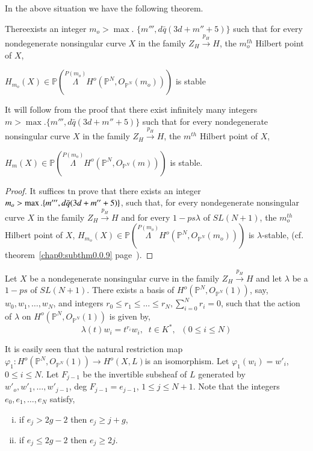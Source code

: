 In the above situation we have the following theorem.

\setcounter{section}{1}
\setcounter{subsection}{0}
\setcounter{subtheorem}{-1}
\begin{subtheorem}\label{chap1:subthm1.0.0}%
There\pageoriginale exists an integer $m_o > \max$. $\{m''', d \bar{q}
(3d+m''+5)\}$ 
such that for every nondegenerate nonsingular curve $X$ in the family
$Z_H \xrightarrow{p_H} H$, the $m_o^{th}$ Hilbert point of $X$, 

\noindent
$H_{m_o} (X) \in \mathbb{P} (\overset{P(m_o)} \Lambda  H^o
(\mathbb{P}^N, O_{\mathbb{P}^N} (m_o)))$  is stable 
\end{subtheorem}

\begin{remark*}
It will follow from the proof that there exist infinitely many integers
$m > \max. \{m''', d \bar{q} (3d+m''+5)\}$ such that for every
nondegenerate nonsingular curve $X$ in the family $Z_H
\xrightarrow{p_H} H$, the $m^{th}$ Hilbert point of $X$,  

\noindent
$H_m (X) \in  \mathbb{P} (\overset{P(m_o)} \Lambda  H^o
(\mathbb{P}^N, O_{\mathbb{P}^N} (m)))$  is stable. 
\end{remark*}

\begin{proof}
It suffices tn prove that there exists an integer $m_o > \max. 
\{m''',\break d \bar{q} (3d+m''+5)\}$, such that, for every nondegenerate
nonsingular curve $X$ in the family $Z_H \xrightarrow{p_H} H$ and
for every  $1-ps \lambda$ of $SL(N+1)$, the $m_o^{th}$ Hilbert point
of $X$, $H_{m_o} (X) \in \mathbb{P} (\overset{P(m_o)}\Lambda  H^o
(\mathbb{P}^N, O{_{\mathbb{P}^N}} (m_o)))$  is $\lambda$-stable,
(cf. theorem~\ref{chap0:subthm0.0.9} page~\pageref{chap0:subthm0.0.9}). 
\end{proof}

Let $X$ be a nondegenerate nonsingular curve in the family $Z_H
\xrightarrow{p_H} H$ and let $\lambda$ be a $1-ps$ of $SL(N+1)$. There
exists a basis of  $H^o (\mathbb{P}^N, O_{\mathbb{P}^N} (1))$,
say, $w_0, w_1,\ldots, w_N$, and integers $r_0 \le r_1 \le \dots
\le r_N, \sum\limits_{i=0}^N r_i = 0$, such that the action of
$\lambda$ on $H^o (\mathbb{P}^N, O_{\mathbb{P}^N} (1))$ is given
by,  
$$
\lambda (t)w_i = t^{r_i} w_i, \;\; t \in  K^*, \;\;  (0 \le i \le N)
$$

\noindent
It is easily seen that the natural restriction map $\varphi_1 : H^o
(\mathbb{P}^N, O_{\mathbb{P}^N} (1)) \to H^o (X,L)$\pageoriginale is an
isomorphism. Let $\varphi_1(w_i) = w'_i$,  $0 \le i \le N$. Let $F_{j-1}$
be the invertible subsheaf of $L$ generated by $w'_o, w'_1 ,\ldots,
w'_{j-1}$, deg $F_{j-1} = e_{j-1}$, $1 \le j \le N+1$. Note that the
integers $e_0, e_1,\ldots, e_N$ satisfy,   
\begin{enumerate}[i)]
\item if $e_j > 2g-2$ then $e_j \ge j+g$,

\item if $e_j \leq 2g-2$ then $e_j \ge 2j$.
\end{enumerate}

